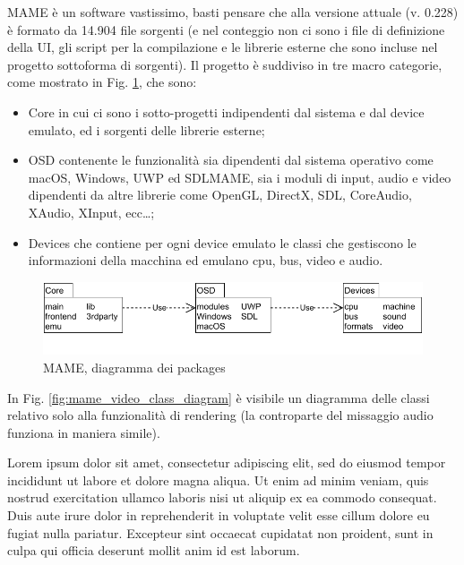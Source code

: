 MAME è un software vastissimo, basti pensare che alla versione attuale (v. 0.228) è formato da 14.904 file sorgenti (e nel conteggio non ci sono i file di definizione della UI, gli script per la compilazione e le librerie esterne che sono incluse nel progetto sottoforma di sorgenti). Il progetto è suddiviso in tre macro categorie, come mostrato in Fig. \ref{fig:mame_arch}, che sono:
\begin{itemize}
	\item Core in cui ci sono i sotto-progetti indipendenti dal sistema e dal device emulato, ed i sorgenti delle librerie esterne;
	\item OSD contenente le funzionalità sia dipendenti dal sistema operativo come macOS, Windows, UWP ed SDLMAME, sia i moduli di input, audio e video dipendenti da altre librerie come OpenGL, DirectX, SDL, CoreAudio, XAudio, XInput, ecc\dots;
	\item Devices che contiene per ogni device emulato le classi che gestiscono le informazioni della macchina ed emulano cpu, bus, video e audio.
\end{itemize} 

\begin{figure}[H]
	\includegraphics[width=\linewidth]{immagini/mame_arch}
	\caption{MAME, diagramma dei packages}
	\label{fig:mame_arch}
\end{figure}


In Fig. \ref{fig:mame_video_class_diagram} è visibile un diagramma delle classi relativo solo alla funzionalità di rendering (la controparte del missaggio audio funziona in maniera simile).

Lorem ipsum dolor sit amet, consectetur adipiscing elit, sed do eiusmod tempor incididunt ut labore et dolore magna aliqua. Ut enim ad minim veniam, quis nostrud exercitation ullamco laboris nisi ut aliquip ex ea commodo consequat. Duis aute irure dolor in reprehenderit in voluptate velit esse cillum dolore eu fugiat nulla pariatur. Excepteur sint occaecat cupidatat non proident, sunt in culpa qui officia deserunt mollit anim id est laborum.


